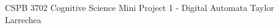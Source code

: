 \documentclass{Classes/solutionclass}
\begin{document}
\pretitle
{CSPB 3702}
{\normalsize{Cognitive Science}}
{\normalsize{Mini Project 1 - Digital Automata}}
{Taylor Larrechea}
\makeatletter
    \startcontents[sections]
    \thispagestyle{fancy}
\makeatother
\vspace{-2em}

\end{document}
